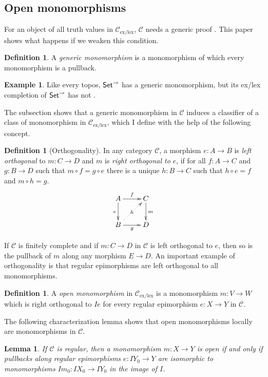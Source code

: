 \documentclass[sort&compress]{elsarticle}
\theoremstyle{plain}
\newtheorem{lemma}[theorem]{Lemma}
\theoremstyle{definition}
\newtheorem{defin}[theorem]{Definition}
\newtheorem{example}[theorem]{Example}
\theoremstyle{remark}
\newcommand\cat\mathcal
\newcommand\exlex{_\mathrm{ex/lex}}\newcommand\exreg{_\mathrm{ex/reg}}
\begin{document}
\subsection{Open monomorphisms}
For an object of all truth values in $\cat C\exlex$, $\cat C$ needs a generic proof \citep{MR1948025}. This paper shows what happens if we weaken this condition.

\begin{defin} A \emph{generic monomorphism} is a monomorphism of which every monomorphism is a pullback. \end{defin}

\begin{example} Like every topos, $\mathsf{Set}^\to$ has a generic monomorphism, but its ex/lex completion of $\mathsf{Set}^\to$ has not \citep[lemma 2.4]{MR2320014}. \end{example}

The subsection shows that a generic monomorphism in $\cat C$ induces a classifier of a class of monomorphism in $\cat C\exlex$, which I define with the help of the following concept.


\begin{defin}[Orthogonality] In any category $\cat C$, a morphism $e:A\to B$ is \emph{left orthogonal} to $m:C\to D$ and $m$ is \emph{right orthogonal to } $e$, if for all $f:A\to C$ and $g:B\to D$ such that $m\circ f = g\circ e$ there is a unique $h:B\to C$ such that $h\circ e = f$ and $m\circ h = g$.
\[ \xymatrix{
A \ar[r]^f\ar[d]_e & C \ar[d]^{m} \\
B \ar[r]_g \ar@{.>}[ur]|h & D
} \]
\end{defin}

If $\cat C$ is finitely complete and if $m:C\to D$ in $\cat C$ is left orthogonal to $e$, then so is the pullback of $m$ along any morphism $E\to D$. An important example of orthogonality is that regular epimorphisms are left orthogonal to all monomorphisms.

\begin{defin} A \emph{open monomorphism} in $\cat C\exlex$ is a monomorphism $m:V\to W$  which is right orthogonal to $Ie$ for every regular epimorphism $e:X\to Y$ in $\cat C$. \end{defin}

The following characterization lemma shows that open monomorphisms locally are monomorphisms in $\cat C$.

\begin{lemma} If $\cat C$ is regular, then a monomorphism $m:X\to Y$ is open if and only if pullbacks along regular epimorphisms $e:IY_0 \to Y$ are isomorphic to monomorphisms $Im_0:IX_0 \to IY_0$ in the image of $I$. \label{charclosed}\end{lemma}
\end{document}
